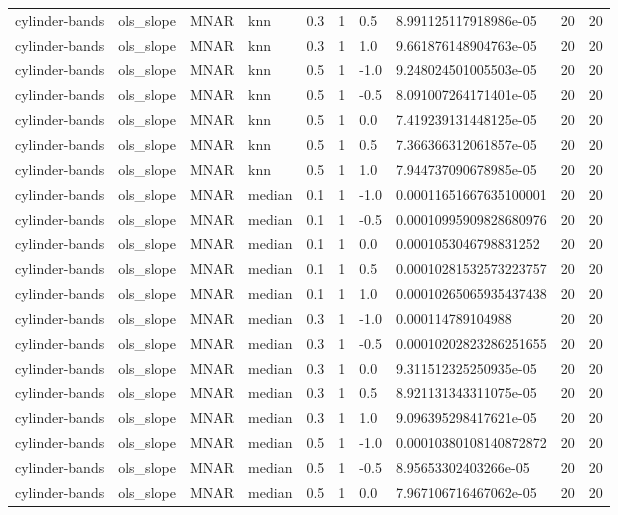 \begin{tabular}{llllllllll}
cylinder-bands & ols\_slope & MNAR & knn & 0.3 & 1 & 0.5 & 8.991125117918986e-05 & 20 & 20 \\
cylinder-bands & ols\_slope & MNAR & knn & 0.3 & 1 & 1.0 & 9.661876148904763e-05 & 20 & 20 \\
cylinder-bands & ols\_slope & MNAR & knn & 0.5 & 1 & -1.0 & 9.248024501005503e-05 & 20 & 20 \\
cylinder-bands & ols\_slope & MNAR & knn & 0.5 & 1 & -0.5 & 8.091007264171401e-05 & 20 & 20 \\
cylinder-bands & ols\_slope & MNAR & knn & 0.5 & 1 & 0.0 & 7.419239131448125e-05 & 20 & 20 \\
cylinder-bands & ols\_slope & MNAR & knn & 0.5 & 1 & 0.5 & 7.366366312061857e-05 & 20 & 20 \\
cylinder-bands & ols\_slope & MNAR & knn & 0.5 & 1 & 1.0 & 7.944737090678985e-05 & 20 & 20 \\
cylinder-bands & ols\_slope & MNAR & median & 0.1 & 1 & -1.0 & 0.00011651667635100001 & 20 & 20 \\
cylinder-bands & ols\_slope & MNAR & median & 0.1 & 1 & -0.5 & 0.00010995909828680976 & 20 & 20 \\
cylinder-bands & ols\_slope & MNAR & median & 0.1 & 1 & 0.0 & 0.0001053046798831252 & 20 & 20 \\
cylinder-bands & ols\_slope & MNAR & median & 0.1 & 1 & 0.5 & 0.00010281532573223757 & 20 & 20 \\
cylinder-bands & ols\_slope & MNAR & median & 0.1 & 1 & 1.0 & 0.00010265065935437438 & 20 & 20 \\
cylinder-bands & ols\_slope & MNAR & median & 0.3 & 1 & -1.0 & 0.000114789104988 & 20 & 20 \\
cylinder-bands & ols\_slope & MNAR & median & 0.3 & 1 & -0.5 & 0.00010202823286251655 & 20 & 20 \\
cylinder-bands & ols\_slope & MNAR & median & 0.3 & 1 & 0.0 & 9.311512325250935e-05 & 20 & 20 \\
cylinder-bands & ols\_slope & MNAR & median & 0.3 & 1 & 0.5 & 8.921131343311075e-05 & 20 & 20 \\
cylinder-bands & ols\_slope & MNAR & median & 0.3 & 1 & 1.0 & 9.096395298417621e-05 & 20 & 20 \\
cylinder-bands & ols\_slope & MNAR & median & 0.5 & 1 & -1.0 & 0.00010380108140872872 & 20 & 20 \\
cylinder-bands & ols\_slope & MNAR & median & 0.5 & 1 & -0.5 & 8.95653302403266e-05 & 20 & 20 \\
cylinder-bands & ols\_slope & MNAR & median & 0.5 & 1 & 0.0 & 7.967106716467062e-05 & 20 & 20 \\

\end{tabular}
